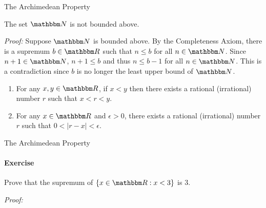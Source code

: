 \documentclass[9pt,aspectratio=169]{beamer}
\newcommand{\RR}{\mathbbm R}
\newcommand{\NN}{\mathbbm N}
\begin{document}
\begin{frame}{The Archimedean Property}
    \begin{theorem}
        The set $\NN$ is not bounded above.
    \end{theorem}
    \emph{Proof:} Suppose $\NN$ is bounded above. By the Completeness Axiom,
    there is a supremum $b \in \RR$ such that $n \leq b$ for all $n \in \NN$.
    Since $n+1 \in \NN$, $n + 1 \leq b$ and thus $n \leq b - 1$ for all $n
    \in \NN$. This is a contradiction since $b$ is no longer the least upper
    bound of $\NN$.
    \vspace{2ex}

    \begin{theorem}
        \begin{enumerate}
            \item For any $x, y \in \RR$, if $x < y$ then there exists a
            rational (irrational) number $r$ such that $x < r < y$.
            \item For any $x \in \RR$ and $\epsilon > 0$, there exists a
            rational (irrational) number $r$ such that $0 < |r - x| <
            \epsilon$.
        \end{enumerate}
    \end{theorem}
\end{frame}

\begin{frame}{The Archimedean Property}
    \framesubtitle{Exercise}
    Prove that the supremum of $\{x \in \RR: x < 3\}$ is 3.

    \emph{Proof:}
\end{frame}
\end{document}
